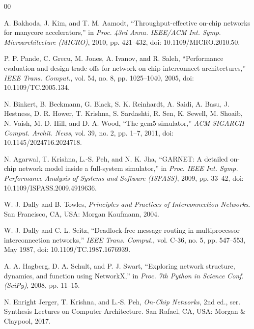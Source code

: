 \documentclass[conference]{IEEEtran}
\begin{document}
\begin{thebibliography}{00}

A. Bakhoda, J. Kim, and T. M. Aamodt,
``Throughput-effective on-chip networks for manycore accelerators,''
in \textit{Proc. 43rd Annu. IEEE/ACM Int. Symp. Microarchitecture (MICRO)},
2010, pp. 421--432, doi: 10.1109/MICRO.2010.50.

P. P. Pande, C. Grecu, M. Jones, A. Ivanov, and R. Saleh,
``Performance evaluation and design trade-offs for network-on-chip interconnect architectures,''
\textit{IEEE Trans. Comput.},
vol. 54, no. 8, pp. 1025--1040, 2005,
doi: 10.1109/TC.2005.134.

N. Binkert, B. Beckmann, G. Black, S. K. Reinhardt, A. Saidi, A. Basu,
J. Hestness, D. R. Hower, T. Krishna, S. Sardashti, R. Sen, K. Sewell,
M. Shoaib, N. Vaish, M. D. Hill, and D. A. Wood,
``The gem5 simulator,''
\textit{ACM SIGARCH Comput. Archit. News},
vol. 39, no. 2, pp. 1--7, 2011,
doi: 10.1145/2024716.2024718.

N. Agarwal, T. Krishna, L.-S. Peh, and N. K. Jha,
``GARNET: A detailed on-chip network model inside a full-system simulator,''
in \textit{Proc. IEEE Int. Symp. Performance Analysis of Systems and Software (ISPASS)},
2009, pp. 33--42,
doi: 10.1109/ISPASS.2009.4919636.

W. J. Dally and B. Towles,
\textit{Principles and Practices of Interconnection Networks}.
San Francisco, CA, USA: Morgan Kaufmann, 2004.

W. J. Dally and C. L. Seitz,
``Deadlock-free message routing in multiprocessor interconnection networks,''
\textit{IEEE Trans. Comput.}, vol. C-36, no. 5, pp. 547--553, May 1987,
doi: 10.1109/TC.1987.1676939.

A. A. Hagberg, D. A. Schult, and P. J. Swart,
``Exploring network structure, dynamics, and function using NetworkX,''
in \textit{Proc. 7th Python in Science Conf. (SciPy)}, 2008, pp. 11--15.

N. Enright Jerger, T. Krishna, and L.-S. Peh,
\textit{On-Chip Networks}, 2nd ed.,
ser. Synthesis Lectures on Computer Architecture.
San Rafael, CA, USA: Morgan \& Claypool, 2017.

\end{thebibliography}
\end{document}
